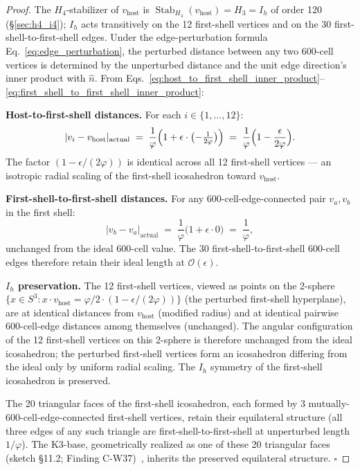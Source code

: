 \documentclass[11pt,letterpaper]{article}
\newcommand{\phig}{\varphi}
\newcommand{\Hfour}{H_4}
\newcommand{\Stab}{\operatorname{Stab}}
\begin{document}
\begin{proof}
The $\Hfour$-stabilizer of $v_{\text{host}}$ is $\Stab_{\Hfour}(v_{\text{host}}) = H_3 = I_h$ of order 120 (\S\ref{sec:h4_i4}); $I_h$ acts transitively on the 12 first-shell vertices and on the 30 first-shell-to-first-shell edges. Under the edge-perturbation formula Eq.~\eqref{eq:edge_perturbation}, the perturbed distance between any two 600-cell vertices is determined by the unperturbed distance and the unit edge direction's inner product with $\hat{n}$. From Eqs.~\eqref{eq:host_to_first_shell_inner_product}--\eqref{eq:first_shell_to_first_shell_inner_product}:

\textbf{Host-to-first-shell distances.} For each $i \in \{1, \ldots, 12\}$:
\[
|v_i - v_{\text{host}}|_{\text{actual}} \;=\; \frac{1}{\phig}\Bigl(1 + \epsilon \cdot \bigl(-\tfrac{1}{2\phig}\bigr)\Bigr) \;=\; \frac{1}{\phig}\Bigl(1 - \frac{\epsilon}{2\phig}\Bigr).
\]
The factor $(1 - \epsilon/(2\phig))$ is identical across all 12 first-shell vertices --- an isotropic radial scaling of the first-shell icosahedron toward $v_{\text{host}}$.

\textbf{First-shell-to-first-shell distances.} For any 600-cell-edge-connected pair $v_a, v_b$ in the first shell:
\[
|v_b - v_a|_{\text{actual}} \;=\; \frac{1}{\phig}\bigl(1 + \epsilon \cdot 0\bigr) \;=\; \frac{1}{\phig},
\]
unchanged from the ideal 600-cell value. The 30 first-shell-to-first-shell 600-cell edges therefore retain their ideal length at $\mathcal{O}(\epsilon)$.

\textbf{$I_h$ preservation.} The 12 first-shell vertices, viewed as points on the 2-sphere $\{x \in S^3 : x \cdot v_{\text{host}} = \phig/2 \cdot (1 - \epsilon/(2\phig))\}$ (the perturbed first-shell hyperplane), are at identical distances from $v_{\text{host}}$ (modified radius) and at identical pairwise 600-cell-edge distances among themselves (unchanged). The angular configuration of the 12 first-shell vertices on this 2-sphere is therefore unchanged from the ideal icosahedron; the perturbed first-shell vertices form an icosahedron differing from the ideal only by uniform radial scaling. The $I_h$ symmetry of the first-shell icosahedron is preserved.

The 20 triangular faces of the first-shell icosahedron, each formed by 3 mutually-600-cell-edge-connected first-shell vertices, retain their equilateral structure (all three edges of any such triangle are first-shell-to-first-shell at unperturbed length $1/\phig$). The K3-base, geometrically realized as one of these 20 triangular faces (sketch \S11.2; Finding C-W37)~\cite{abshier_capotauro_chiral_mechanism_sketch}, inherits the preserved equilateral structure.
$\square$
\end{proof}
\end{document}
